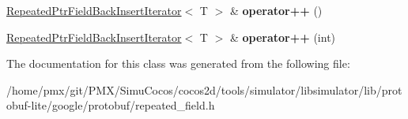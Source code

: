 \begin{DoxyCompactItemize}
\hyperlink{classgoogle_1_1protobuf_1_1internal_1_1RepeatedPtrFieldBackInsertIterator}{Repeated\+Ptr\+Field\+Back\+Insert\+Iterator}$<$ T $>$ \& {\bfseries operator++} ()
\item 
\mbox{\label{classgoogle_1_1protobuf_1_1internal_1_1RepeatedPtrFieldBackInsertIterator_a176b35f598d12202f4d9df8664410813}} 
\hyperlink{classgoogle_1_1protobuf_1_1internal_1_1RepeatedPtrFieldBackInsertIterator}{Repeated\+Ptr\+Field\+Back\+Insert\+Iterator}$<$ T $>$ \& {\bfseries operator++} (int)
\end{DoxyCompactItemize}


The documentation for this class was generated from the following file\+:\begin{DoxyCompactItemize}
\item 
/home/pmx/git/\+P\+M\+X/\+Simu\+Cocos/cocos2d/tools/simulator/libsimulator/lib/protobuf-\/lite/google/protobuf/repeated\+\_\+field.\+h\end{DoxyCompactItemize}
